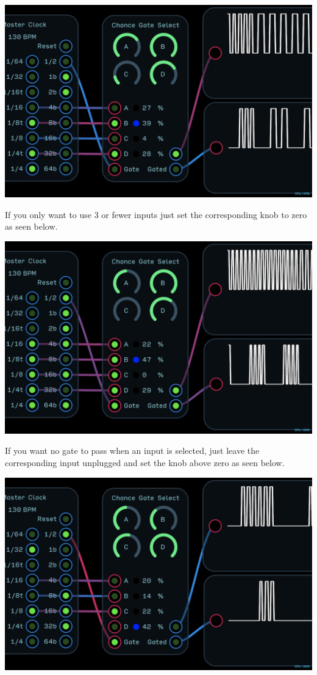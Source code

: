 \documentclass[11pt]{book}
\begin{document}
\begin{multicols*}{2}
\begin{center}
\includegraphics[width=0.95\linewidth]{chance-gate-select-fig2.png}
\end{center}

If you only want to use 3 or fewer inputs just set the corresponding knob to zero as seen below.

\begin{center}
\includegraphics[width=0.95\linewidth]{chance-gate-select-fig3.png}
\end{center}

If you want no gate to pass when an input is selected, just leave the corresponding input unplugged and set the knob above zero as seen below.

\begin{center}
\includegraphics[width=0.95\linewidth]{chance-gate-select-fig4.png}
\end{center}


\end{multicols*}
\end{document}
